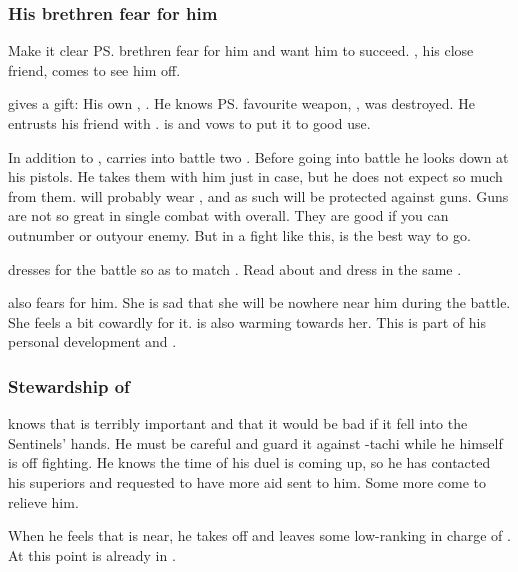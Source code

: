 \subsubsection{His brethren fear for him}
Make it clear \ps{\Teshrial} brethren fear for him and want him to succeed. 
\Menessiaraid, his close friend, comes to see him off. 

\Menessiaraid{} gives \Teshrial{} a gift: 
His own \senaan, . 
He knows \ps{\Teshrial} favourite weapon, , was destroyed. 
He entrusts his friend with \Ossiraith. 
\Teshrial{} is \honoured and vows to put it to good use. 

In addition to \Ossiraith, \Teshrial{} carries into battle two . 
Before going into battle he looks down at his pistols. 
He takes them with him just in case, but he does not expect so much from them. 
\Ishnaruchaefir{} will probably wear , and as such will be protected against guns. 
Guns are not so great in single combat with \dragons{} overall.
They are good if you can outnumber or out\manoeuvre your enemy. 
But in a fight like this, \melee{} is the best way to go. 

\Teshrial dresses for the battle so as to match \Ossiraith. 
Read about  and dress \Teshrial in the same \colour. 

\Urizeth also fears for him.
She is sad that she will be nowhere near him during the battle.
She feels a bit cowardly for it.
\Teshrial is also warming towards her.
This is part of his personal development and . 





\subsubsection{Stewardship of \Malcur}
\Teshrial{} knows that \Malcur is terribly important and that it would be bad if it fell into the Sentinels' hands. 
He must be careful and guard it against \Psyrex-tachi while he himself is off fighting. 
He knows the time of his duel is coming up, so he has contacted his superiors and requested to have more aid sent to him. 
Some more \resphain{} come to relieve him. 

When he feels that \Ishnaruchaefir{} is near, he takes off and leaves some low-ranking \resphain{} in charge of \Malcur. 
At this point \Achsah{} is already in \Forclin. 

